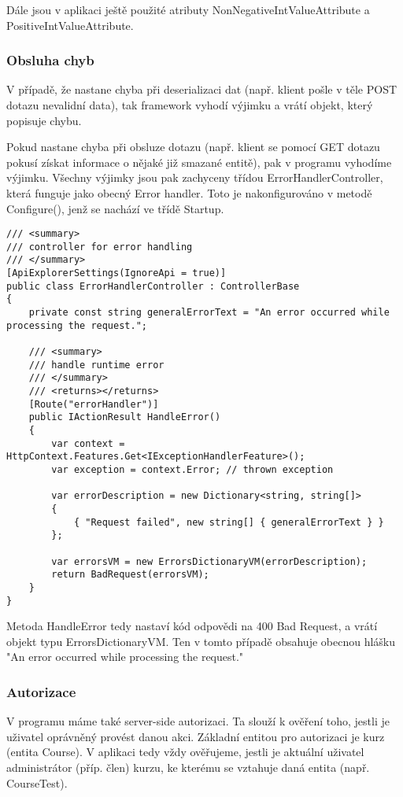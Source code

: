 Dále jsou v aplikaci ještě použité atributy NonNegativeIntValueAttribute a PositiveIntValueAttribute.


\subsubsection*{Obsluha chyb}

V případě, že nastane chyba při deserializaci dat (např. klient pošle v těle POST dotazu nevalidní data), tak framework vyhodí výjimku a vrátí objekt, který popisuje chybu. \cite{AspNetCoreDocs}

Pokud nastane chyba při obsluze dotazu (např. klient se pomocí GET dotazu pokusí získat informace o nějaké již smazané entitě), pak v programu vyhodíme výjimku. Všechny výjimky jsou pak zachyceny třídou ErrorHandlerController, která funguje jako obecný Error handler.
Toto je nakonfigurováno v metodě Configure(), jenž se nachází ve třídě Startup.
\begin{lstlisting}
/// <summary>
/// controller for error handling
/// </summary>
[ApiExplorerSettings(IgnoreApi = true)]
public class ErrorHandlerController : ControllerBase
{
	private const string generalErrorText = "An error occurred while processing the request.";
	
	/// <summary>
	/// handle runtime error
	/// </summary>
	/// <returns></returns>
	[Route("errorHandler")]
	public IActionResult HandleError()
	{
		var context = HttpContext.Features.Get<IExceptionHandlerFeature>();
		var exception = context.Error; // thrown exception
		
		var errorDescription = new Dictionary<string, string[]>
		{
			{ "Request failed", new string[] { generalErrorText } }
		};
		
		var errorsVM = new ErrorsDictionaryVM(errorDescription);
		return BadRequest(errorsVM);
	}
}
\end{lstlisting}
Metoda HandleError tedy nastaví kód odpovědi na 400 Bad Request, a vrátí objekt typu ErrorsDictionaryVM.
Ten v tomto případě obsahuje obecnou hlášku "An error occurred while processing the request."

\subsubsection*{Autorizace}

V programu máme také server-side autorizaci. Ta slouží k ověření toho, jestli je uživatel oprávněný provést danou akci. Základní entitou pro autorizaci je kurz (entita Course). V aplikaci tedy vždy ověřujeme, jestli je aktuální uživatel administrátor (příp. člen) kurzu, ke kterému se vztahuje daná entita (např. CourseTest).

